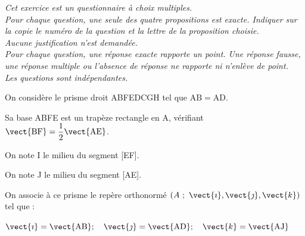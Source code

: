 \emph{Cet exercice est un questionnaire à choix multiples.\\
Pour chaque question, une seule des quatre propositions est exacte. Indiquer sur la copie le numéro de la question et la lettre de la proposition choisie.\\
Aucune justification n'est demandée.\\
Pour chaque question, une réponse exacte rapporte un point. Une réponse fausse, une réponse multiple ou l'absence de réponse ne rapporte ni n'enlève de point.\\
Les questions sont indépendantes.}

\bigskip

On considère le prisme droit ABFEDCGH tel que $\mathrm{AB} = \mathrm{AD}$.

Sa base ABFE est un trapèze rectangle en A, vérifiant $\vect{\mathrm{BF}} = \dfrac{1}{2} \vect{\mathrm{AE}}$.

On note I le milieu du segment [EF].

On note J le milieu du segment [AE].

On associe à ce prisme le repère orthonormé $\left(A~;~ \vect{\imath}, \vect{\jmath}, \vect{k}\right)$ tel que :

$\vect{\imath} = \vect{\mathrm{AB}} ;\quad \vect{\jmath} = \vect{\mathrm{AD}} ;\quad \vect{k} = \vect{\mathrm{AJ}}$

\begin{center}
\end{center}

